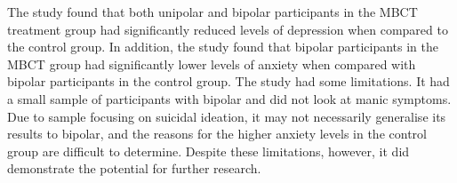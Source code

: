 The study found that both unipolar and bipolar participants in the MBCT treatment group had significantly reduced levels of depression when compared to the control group. In addition, the study found that bipolar participants in the MBCT group had significantly lower levels of anxiety when compared with bipolar participants in the control group. The study had some limitations. It had a small sample of participants with bipolar and did not look at manic symptoms. Due to sample focusing on suicidal ideation, it may not necessarily generalise its results to bipolar, and the reasons for the higher anxiety levels in the control group are difficult to determine. Despite these limitations, however, it did demonstrate the potential for further research.